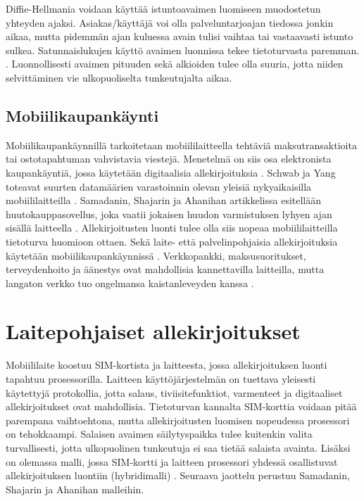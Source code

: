 \documentclass[finnish]{tktltiki2}
\theoremstyle{definition}
\theoremstyle{remark}
\begin{document}
Diffie-Hellmania voidaan käyttää istuntoavaimen luomiseen muodostetun yhteyden ajaksi. Asiakas/käyttäjä voi olla palveluntarjoajan tiedossa jonkin aikaa, mutta pidemmän ajan kuluessa avain tulisi vaihtaa tai vastaavasti istunto sulkea. Satunnaislukujen käyttö avaimen luonnissa tekee tietoturvasta paremman. \cite{enti}. Luonnollisesti avaimen pituuden sekä alkioiden tulee olla suuria, jotta niiden selvittäminen vie ulkopuoliselta tunkeutujalta aikaa. 


\subsection{Mobiilikaupankäynti}

Mobiilikaupankäynnillä tarkoitetaan mobiililaitteella tehtäviä maksutransaktioita tai ostotapahtuman vahvistavia viestejä. Menetelmä on siis osa elektronista kaupankäyntiä, jossa käytetään digitaalisia allekirjoituksia \cite{e-c}. Schwab ja Yang toteavat suurten datamäärien varastoinnin olevan yleisiä nykyaikaisilla mobiililaitteilla \cite{enti}. Samadanin, Shajarin ja Ahanihan artikkelissa esitellään huutokauppasovellus, joka vaatii jokaisen huudon varmistuksen lyhyen ajan sisällä laitteella \cite{proxy}. Allekirjoitusten luonti tulee olla siis nopeaa mobiililaitteilla tietoturva huomioon ottaen. Sekä laite- että palvelinpohjaisia allekirjoituksia käytetään mobiilikaupankäynnissä \cite{proxy}. Verkkopankki, maksusuoritukset, terveydenhoito ja äänestys ovat mahdollisia kannettavilla laitteilla, mutta langaton verkko tuo ongelmansa kaistanleveyden kanssa \cite{ECC}. 



\section{Laitepohjaiset allekirjoitukset}

Mobiililaite koostuu SIM-kortista ja laitteesta, jossa allekirjoituksen luonti tapahtuu prosessorilla. Laitteen käyttöjärjestelmän on tuettava yleisesti käytettyjä protokollia, jotta salaus, tiviisitefunktiot, varmenteet ja digitaaliset allekirjoitukset ovat mahdollisia. Tietoturvan kannalta SIM-korttia voidaan pitää parempana vaihtoehtona, mutta allekirjoitusten luomisen nopeudessa prosessori on tehokkaampi. Salaisen avaimen säilytyspaikka tulee kuitenkin valita turvallisesti, jotta ulkopuolinen tunkeutuja ei saa tietää salaista avainta. Lisäksi on olemassa malli, jossa SIM-kortti ja laitteen prosessori yhdessä osallistuvat allekirjoituksen luontiin (hybridimalli) \cite{proxy}. Seuraava jaottelu perustuu Samadanin, Shajarin ja Ahanihan malleihin. 
 
\end{document}
